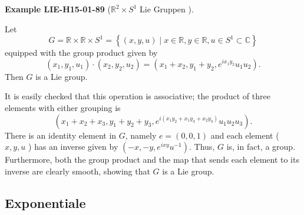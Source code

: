 \documentclass[10pt, letterpaper]{article}
\newcommand{\R}{\mathbb{R}}
\newcommand{\CustomHeading}[3]{%
  \par\medskip\noindent%
  \textbf{#1 #2} \textnormal{(#3)}.\enskip%
}
\newenvironment{EXA}[2]{\CustomHeading{Example}{#1}{#2}}{}
\begin{document}
\begin{EXA}{LIE-H15-01-89}{$\R^2\times S^1$ Lie Gruppen }
Let
$$
G=\mathbb{R} \times \mathbb{R} \times S^{1}=\left\{(x, y, u) \mid x \in \mathbb{R}, y \in \mathbb{R}, u \in S^{1} \subset \mathbb{C}\right\}
$$
equipped with the group product given by
$$
\left(x_{1}, y_{1}, u_{1}\right) \cdot\left(x_{2}, y_{2}, u_{2}\right)=\left(x_{1}+x_{2}, y_{1}+y_{2}, e^{i x_{1} y_{2}} u_{1} u_{2}\right) .
$$
Then $G$ is a Lie group.

It is easily checked that this operation is associative; the product of three elements with either grouping is
$$
\left(x_{1}+x_{2}+x_{3}, y_{1}+y_{2}+y_{3}, e^{i\left(x_{1} y_{2}+x_{1} y_{3}+x_{2} y_{3}\right)} u_{1} u_{2} u_{3}\right) .
$$
There is an identity element in $G$, namely $e=(0,0,1)$ and each element ( $x, y, u$ ) has an inverse given by $\left(-x,-y, e^{i x y} u^{-1}\right)$. Thus, $G$ is, in fact, a group. Furthermore, both the group product and the map that sends each element to its inverse are clearly smooth, showing that $G$ is a Lie group.
\end{EXA}

\subsection{Exponentiale}
\end{document}
